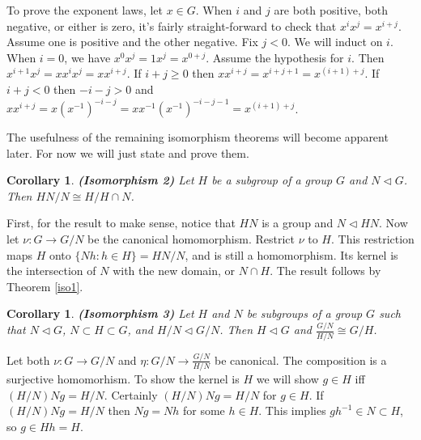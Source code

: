 \documentclass[letterpaper]{article}
\newtheorem{corollary}[theorem]{Corollary}
\newenvironment{proof}[1][Proof]{\begin{trivlist}
\item[\hskip \labelsep {\bfseries #1}]}{\end{trivlist}}
\begin{document}
To prove the exponent laws, let $x \in G$. When $i$ and $j$ are
both positive, both negative, or either is zero, it's fairly
straight-forward to check that $x^ix^j = x^{i+j}$. Assume one is
positive and the other negative. Fix $j < 0$. We will induct on
$i$. When $i = 0$, we have $x^0x^j = 1x^j = x^{0+j}$. Assume the
hypothesis for $i$. Then $x^{i+1}x^j = xx^ix^j = xx^{i+j}$. If $i
+ j \geq 0$ then $xx^{i+j} = x^{i+j+1} = x^{(i+1)+j}$. If $i + j <
0$ then $-i -j > 0$ and $xx^{i+j} = x(x^{-1})^{-i - j} =
xx^{-1}(x^{-1})^{-i -j -1} = x^{(i+1) + j}$.

The usefulness of the remaining isomorphism theorems will become
apparent later. For now we will just state and prove them.

\begin{corollary}
\label{iso2}
\emph{\textbf{(Isomorphism 2)}}
Let $H$ be a subgroup of a group $G$ and $N \lhd G$.  Then $HN/N
\cong H/{H \cap N}$.
\end{corollary}
\begin{proof}
First, for the result to make sense, notice that $HN$ is a group
and $N \lhd HN$.  Now let $\nu \colon G \rightarrow G/N$ be the
canonical homomorphism. Restrict $\nu$ to $H$. This restriction
maps $H$ onto $\{Nh \colon h \in H\} = HN/N$, and is still a
homomorphism. Its kernel is the intersection of $N$ with the new
domain, or $N \cap H$. The result follows by Theorem \ref{iso1}.
\end{proof}

\begin{corollary}
\label{iso3}
\emph{\textbf{(Isomorphism 3)}}
Let $H$ and $N$ be subgroups of a group $G$ such that $N \lhd G$,
$N \subset H \subset G$, and $H/N \lhd G/N$. Then $H \lhd G$ and
$\frac{G/N}{H/N} \cong G/H$.
\end{corollary}
\begin{proof}
Let both $\nu \colon G \rightarrow G/N$ and $\eta \colon G/N
\rightarrow \frac{G/N}{H/N}$ be canonical. The composition is a
surjective homomorhism. To show the kernel is $H$ we will show $g
\in H$ iff $(H/N)Ng = H/N$. Certainly $(H/N)Ng = H/N$ for $g \in
H$. If $(H/N)Ng = H/N$ then $Ng = Nh$ for some $h \in H$. This
implies $gh^{-1} \in N \subset H$, so $g \in Hh = H$.
\end{proof}
\end{document}
